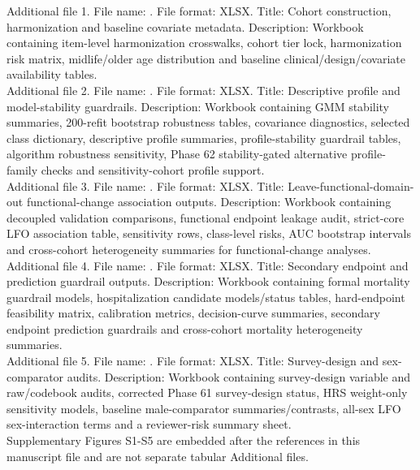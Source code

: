 \documentclass[pdflatex,sn-vancouver-num]{sn-jnl}
\begin{document}
Additional file 1. File name: . File format: XLSX. Title: Cohort construction, harmonization and baseline covariate metadata. Description: Workbook containing item-level harmonization crosswalks, cohort tier lock, harmonization risk matrix, midlife/older age distribution and baseline clinical/design/covariate availability tables.\\
Additional file 2. File name: . File format: XLSX. Title: Descriptive profile and model-stability guardrails. Description: Workbook containing GMM stability summaries, 200-refit bootstrap robustness tables, covariance diagnostics, selected class dictionary, descriptive profile summaries, profile-stability guardrail tables, algorithm robustness sensitivity, Phase 62 stability-gated alternative profile-family checks and sensitivity-cohort profile support.\\
Additional file 3. File name: . File format: XLSX. Title: Leave-functional-domain-out functional-change association outputs. Description: Workbook containing decoupled validation comparisons, functional endpoint leakage audit, strict-core LFO association table, sensitivity rows, class-level risks, AUC bootstrap intervals and cross-cohort heterogeneity summaries for functional-change analyses.\\
Additional file 4. File name: . File format: XLSX. Title: Secondary endpoint and prediction guardrail outputs. Description: Workbook containing formal mortality guardrail models, hospitalization candidate models/status tables, hard-endpoint feasibility matrix, calibration metrics, decision-curve summaries, secondary endpoint prediction guardrails and cross-cohort mortality heterogeneity summaries.\\
Additional file 5. File name: . File format: XLSX. Title: Survey-design and sex-comparator audits. Description: Workbook containing survey-design variable and raw/codebook audits, corrected Phase 61 survey-design status, HRS weight-only sensitivity models, baseline male-comparator summaries/contrasts, all-sex LFO sex-interaction terms and a reviewer-risk summary sheet.\\

Supplementary Figures S1-S5 are embedded after the references in this manuscript file and are not separate tabular Additional files.
\end{document}
